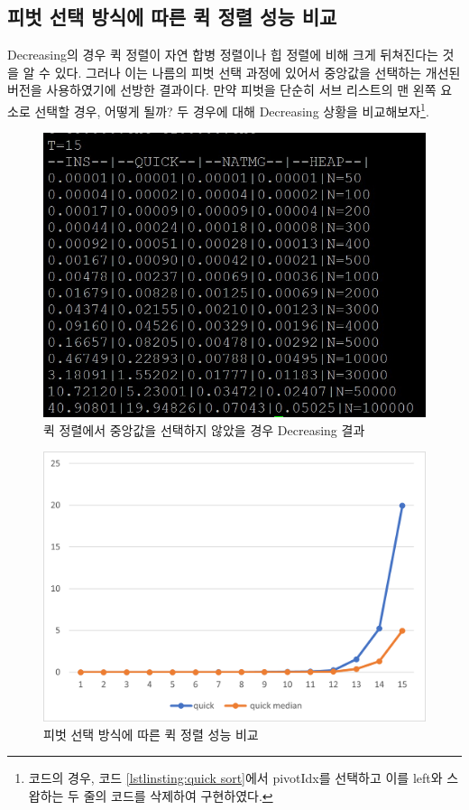 \documentclass{article}
\begin{document}
\subsection{피벗 선택 방식에 따른 퀵 정렬 성능 비교}
Decreasing의 경우 퀵 정렬이 자연 합병 정렬이나 힙 정렬에 비해 크게 뒤쳐진다는 것을 알 수 있다. 그러나 이는 나름의 피벗 선택 과정에 있어서 중앙값을 선택하는 개선된 버전을 사용하였기에 선방한 결과이다. 만약 피벗을 단순히 서브 리스트의 맨 왼쪽 요소로 선택할 경우, 어떻게 될까? 두 경우에 대해 Decreasing 상황을 비교해보자\footnote{코드의 경우, 코드 \ref{lstlinsting:quick sort}에서 pivotIdx를 선택하고 이를 left와 스왑하는 두 줄의 코드를 삭제하여 구현하였다.}.

\begin{figure}
    \centering
    \includegraphics{result_quick_notMedian_decreasing.jpg}
    \caption{퀵 정렬에서 중앙값을 선택하지 않았을 경우 Decreasing 결과}
    \label{fig:not median result}
\end{figure}

\begin{figure}
    \centering
    \includegraphics{compare_quick_pivot.png}
    \caption{피벗 선택 방식에 따른 퀵 정렬 성능 비교}
    \label{fig:compare quick with pivot}
\end{figure}
\end{document}

